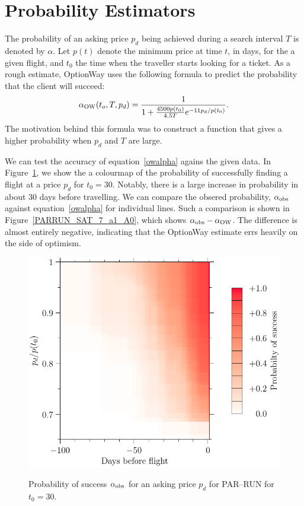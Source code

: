 \documentclass{article}
\begin{document}
\section{Probability Estimators}
The probability of an asking price $p_d$ being achieved during a
search interval $T$ is denoted by $\alpha$.  Let $p(t)$ denote the
minimum price at time $t$, in days, for the a given flight, and $t_0$
the time when the traveller starts looking for a ticket.  As a rough
estimate, OptionWay uses the following formula to predict the
probability that the client will succeed:
\begin{dmath}
  \alpha_{\rm{OW}}(t_o,T,p_d) = \frac{1}{1 + \frac{4500 p(t_0)}{4.5 T}e^{-11 p_d / p(t_0)}}.
  \label{owalpha}
\end{dmath}
The motivation behind this formula was to construct a function that
gives a higher probability when $p_d$ and $T$ are large.

We can test the accuracy of equation~\eqref{owalpha} agains the given
data.  In Figure~\ref{PARRUN_SAT_7_a0}, we show the a colourmap of the
probability of successfully finding a flight at a price $p_d$ for
$t_0=30$.  Notably, there is a large increase in probability in about
30 days before travelling.  We can compare the obsered probability,
$\alpha_{\rm{obs}}$ against equation~\eqref{owalpha} for individual
lines.  Such a comparison is shown in Figure~\ref{PARRUN_SAT_7_a1_A0},
which shows $\alpha_{\rm{obs}}-\alpha_{\rm{OW}}$.  The difference is
almost entirely negative, indicating that the OptionWay estimate errs
heavily on the side of optimism.  
\begin{figure}
  \begin{center}
    \includegraphics{pdf/PARRUN_SAT_7_a0}
    \label{PARRUN_SAT_7_a0}
    \caption{Probability of success $\alpha_{\rm{obs}}$ for an asking
      price $p_d$ for PAR--RUN for $t_0=30$.}
  \end{center}
\end{figure}
\end{document}
